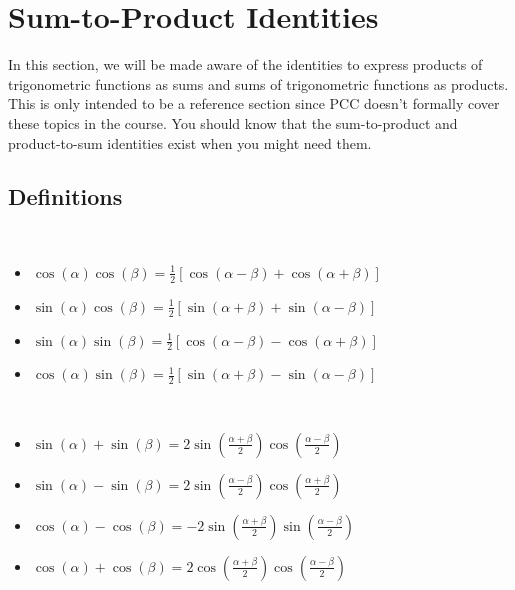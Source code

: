 
\section{Sum-to-Product Identities} \label{section-sum-to-product-identities}
In this section, we will be made aware of the identities to express products of trigonometric functions as sums and sums of trigonometric functions as products. This is only intended to be a reference section since PCC doesn't formally cover these topics in the course. You should know that the sum-to-product and product-to-sum identities exist when you might need them.


\subsection*{Definitions} \label{definitions-section-sum-to-product-identities}

\begin{myDefinition}~\\[0.5mm]
	\begin{itemize}
		\item $\cos(\alpha)\cos(\beta)=\frac{1}{2}\left[\cos(\alpha-\beta)+\cos(\alpha+\beta)\right]$
		\vfill
		\item $\sin(\alpha)\cos(\beta)=\frac{1}{2}\left[\sin(\alpha+\beta)+\sin(\alpha-\beta)\right]$
		\vfill
		\item $\sin(\alpha)\sin(\beta)=\frac{1}{2}\left[\cos(\alpha-\beta)-\cos(\alpha+\beta)\right]$
		\vfill
		\item $\cos(\alpha)\sin(\beta)=\frac{1}{2}\left[\sin(\alpha+\beta)-\sin(\alpha-\beta)\right]$
		\vfill
	\end{itemize}
\end{myDefinition}

\begin{myDefinition}~\\[0.5mm]
	\begin{itemize}
		\item $\sin(\alpha)+\sin(\beta)=2\sin\left(\frac{\alpha+\beta}{2}\right)\cos\left(\frac{\alpha-\beta}{2}\right)$
		\vfill
		\item $\sin(\alpha)-\sin(\beta)=2\sin\left(\frac{\alpha-\beta}{2}\right)\cos\left(\frac{\alpha+\beta}{2}\right)$
		\vfill
		\item $\cos(\alpha)-\cos(\beta)=-2\sin\left(\frac{\alpha+\beta}{2}\right)\sin\left(\frac{\alpha-\beta}{2}\right)$
		\vfill
		\item $\cos(\alpha)+\cos(\beta)=2\cos\left(\frac{\alpha+\beta}{2}\right)\cos\left(\frac{\alpha-\beta}{2}\right)$
		\vfill
	\end{itemize}
\end{myDefinition}

